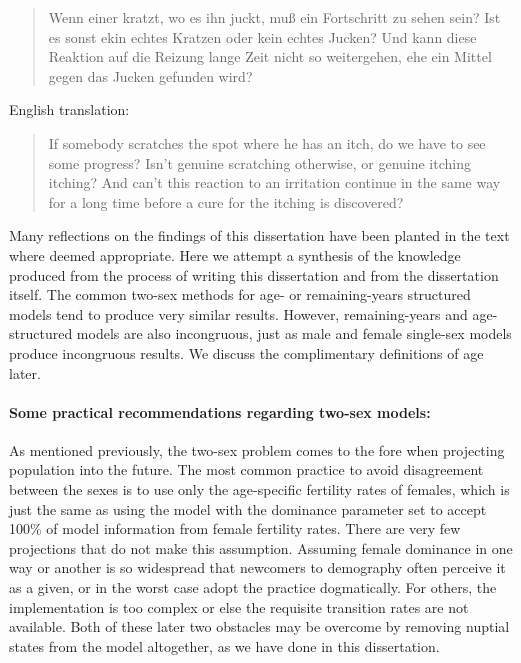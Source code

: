 \FloatBarrier
\label{sec:reflections}

\begin{singlespace}
\begin{quote}
Wenn einer kratzt, wo es ihn juckt, mu{\ss} ein Fortschritt zu sehen sein? Ist
es sonst ekin echtes Kratzen oder kein echtes Jucken? Und kann diese Reaktion
auf die Reizung lange Zeit nicht so weitergehen, ehe ein Mittel gegen das Jucken
gefunden wird?
\citep{wittgenstein1984culture}
\end{quote}

English translation:
\begin{quote}
 If somebody scratches the spot where he has an itch, do we have to see 
 some progress? Isn't genuine scratching otherwise, or genuine itching 
itching? And can't this reaction to an irritation continue in the 
same way for a long time before a cure for the itching is discovered?
\citep{wittgenstein1984culture}
\end{quote}
\end{singlespace}

Many reflections on the findings of this dissertation have been planted in the
text where deemed appropriate. Here we attempt a synthesis of the
knowledge produced from the process of writing this dissertation and from the
dissertation itself. The common two-sex methods for age- or remaining-years
structured models tend to produce very similar results. However, remaining-years
and age-structured models are also incongruous, just as male and female
single-sex models produce incongruous results. We discuss the complimentary definitions 
of age later. 

\paragraph{Some practical recommendations regarding two-sex models: }
As mentioned previously, the two-sex problem comes to the fore when projecting
population into the future. The most common practice to avoid disagreement between the sexes is to
use only the age-specific fertility rates of females, which is just the same as
using the \citet{goodman1967age} model with the dominance parameter set to
accept 100\% of model information from female fertility rates. There are
very few projections that do not make this assumption. Assuming female dominance
in one way or another is so widespread that newcomers to demography often perceive 
it as a given, or in the worst case adopt the
practice dogmatically. For others, the implementation is too complex or
else the requisite transition rates are not available. Both of these later
two obstacles may be overcome by removing nuptial states from the model
altogether, as we have done in this dissertation. 


